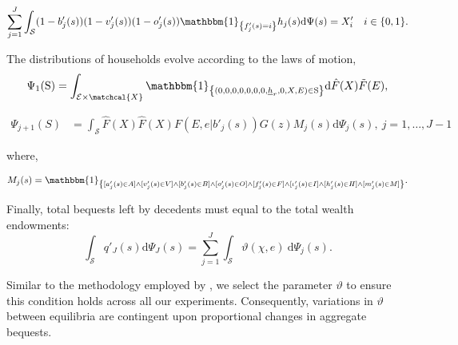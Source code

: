 \documentclass[parskip=full]{article}
\newcommand{\indicator}[1]{\mathbbm{1}_{\left\{ {#1} \right\} }}
\begin{document}
\begin{equation}
\label{eq:rental_housing_clearing_condition}
  \sum_{j=1}^J \int_\mathcal{S} (1-b'_{j}(s))(1-v'_{j}(s)) (1-o'_{j}(s))\indicator{f'_{j}(s)=i}h_{j}(s) \mathrm{d}\Psi(s) = X'_{i} \quad i \in \{0,1\}.
\end{equation}

The distributions of households evolve according to the laws of motion,
\begin{align}\label{eq:lom2}
\Psi_{1}(\mathrm{S})=\int_{\mathcal{E} \times \matchcal{X}} \indicator{(0,0,0,0,0,0,0,\underline{h}_{r},0,X,E)\in \mathrm{S}}\mathrm{d} \hat{F}(X)\tilde{F}(E),
\end{align}

\begin{align}
\Psi_{j+1}(S) &=\int_{\mathcal{S}} \hat{F}(X)\hat{F}(X)F(E,e|b'_{j}(s))G(z)M_{j}(s)\mathrm{d}\Psi_{j}(s),\ j=1,\ldots,J-1\label{eq:lom1}
\end{align}

\noindent where,

\begin{align}
    M_{j}(s) = \indicator{[a'_{j}(s)\in A] \land [v'_{j}(s)\in V] \land [b'_{j}(s)\in B] \land [o'_{j}(s)\in O] \land [f'_{j}(s)\in F] \land [\iota'_{j}(s)\in I] \land [h'_{j}(s) \in H] \land [m'_{j}(s) \in M]}.\notag
\end{align}

Finally, total bequests left by decedents must equal to the total wealth endowments:
\begin{equation}
\label{lom:agg_bequests}
      \int_{\mathcal{S}} q'_{J}(s) \mathrm{d}\Psi_{J}(s) =  \sum_{j=1}^J \int_{\mathcal{S}} \vartheta (\chi,e)\ \mathrm{d}\Psi_j(s).
\end{equation}

\noindent Similar to the methodology employed by \citet{kkk-2021}, we select the parameter $\vartheta$ to ensure this condition holds across all our experiments. Consequently, variations in $\vartheta$ between equilibria are contingent upon proportional changes in aggregate bequests.
\end{document}
